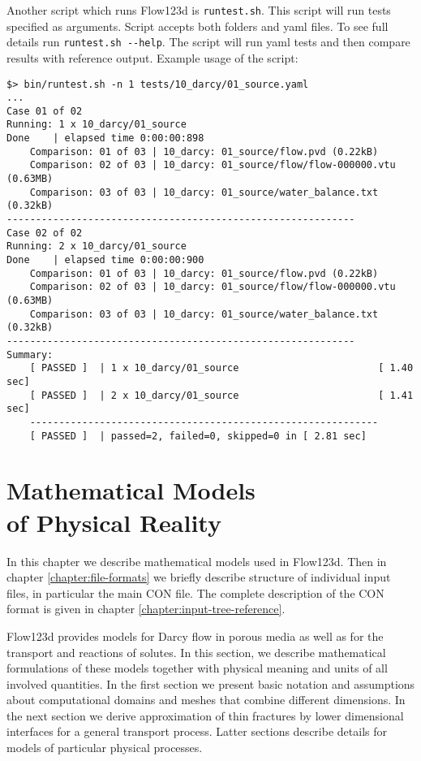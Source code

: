 \documentclass[12pt,a4paper]{report}
\begin{document}
Another script which runs Flow123d is \verb'runtest.sh'. This script will run tests specified as arguments. Script accepts both folders
and yaml files. To see full details run \verb'runtest.sh --help'. The script will run yaml tests and then compare results with reference
output. Example usage of the script:

\begin{verbatim}
$> bin/runtest.sh -n 1 tests/10_darcy/01_source.yaml 
...
Case 01 of 02
Running: 1 x 10_darcy/01_source
Done    | elapsed time 0:00:00:898                                              
    Comparison: 01 of 03 | 10_darcy: 01_source/flow.pvd (0.22kB)
    Comparison: 02 of 03 | 10_darcy: 01_source/flow/flow-000000.vtu (0.63MB)
    Comparison: 03 of 03 | 10_darcy: 01_source/water_balance.txt (0.32kB)
------------------------------------------------------------
Case 02 of 02
Running: 2 x 10_darcy/01_source
Done    | elapsed time 0:00:00:900                                              
    Comparison: 01 of 03 | 10_darcy: 01_source/flow.pvd (0.22kB)
    Comparison: 02 of 03 | 10_darcy: 01_source/flow/flow-000000.vtu (0.63MB)
    Comparison: 03 of 03 | 10_darcy: 01_source/water_balance.txt (0.32kB)
------------------------------------------------------------
Summary: 
    [ PASSED ]  | 1 x 10_darcy/01_source                        [ 1.40 sec] 
    [ PASSED ]  | 2 x 10_darcy/01_source                        [ 1.41 sec] 
    ------------------------------------------------------------
    [ PASSED ]  | passed=2, failed=0, skipped=0 in [ 2.81 sec]

\end{verbatim}










\chapter[Mathematical Models of Physical Reality]{Mathematical Models \\of Physical Reality}
\label{chapter:mathematical_models}

In this chapter we describe mathematical models used in Flow123d.
Then in chapter \ref{chapter:file-formats} we briefly describe structure of individual input files, in particular the main CON file.
The complete description of the CON format is given in chapter \ref{chapter:input-tree-reference}.

Flow123d provides models for Darcy flow in porous media as well as for the transport and reactions of solutes. In this section, we describe 
mathematical formulations of these models together with physical meaning and units of all involved quantities. In the first section we present 
basic notation and assumptions about computational domains and meshes that combine different dimensions. In the next section we
derive approximation of thin fractures by lower dimensional interfaces for a general transport process. Latter sections describe details for models of particular
physical processes.
\end{document}
